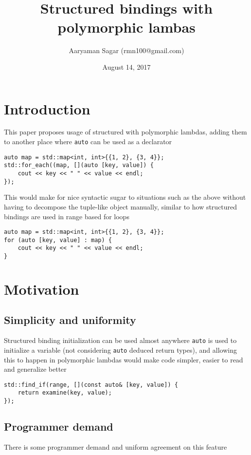 \documentclass{article}
\begin{document}
\title{\textbf{Structured bindings with polymorphic lambas}}
\author{Aaryaman Sagar (rmn100@gmail.com)}
\date{August 14, 2017}
\maketitle

\section{Introduction}

This paper proposes usage of structured with polymorphic lambdas, adding them
to another place where \texttt{auto} can be used as a declarator

\begin{lstlisting}
auto map = std::map<int, int>{{1, 2}, {3, 4}};
std::for_each((map, [](auto [key, value]) {
    cout << key << " " << value << endl;
});
\end{lstlisting}

This would make for nice syntactic sugar to situations such as the above
without having to decompose the tuple-like object manually, similar to how
structured bindings are used in range based for loops

\begin{lstlisting}
auto map = std::map<int, int>{{1, 2}, {3, 4}};
for (auto [key, value] : map) {
    cout << key << " " << value << endl;
}
\end{lstlisting}


\section{Motivation}

\subsection{Simplicity and uniformity}
Structured binding initialization can be used almost anywhere \texttt{auto} is
used to initialize a variable (not considering \texttt{auto} deduced return
types), and allowing this to happen in polymorphic lambdas would make code
simpler, easier to read and generalize better

\begin{lstlisting}
std::find_if(range, [](const auto& [key, value]) {
    return examine(key, value);
});
\end{lstlisting}

\subsection{Programmer demand}
There is some programmer demand and uniform agreement on this feature
\end{document}
